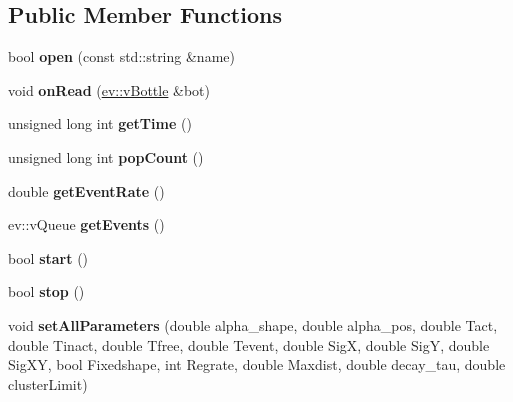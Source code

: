 \subsection*{Public Member Functions}
\begin{DoxyCompactItemize}
\item 
bool {\bfseries open} (const std\+::string \&name)\hypertarget{classEventBottleManager_a41ce7bd0a716ab0a88c1ad505b02d20b}{}\label{classEventBottleManager_a41ce7bd0a716ab0a88c1ad505b02d20b}

\item 
void {\bfseries on\+Read} (\hyperlink{classev_1_1vBottle}{ev\+::v\+Bottle} \&bot)\hypertarget{classEventBottleManager_aa848144d06e1970fb3c0482da838f078}{}\label{classEventBottleManager_aa848144d06e1970fb3c0482da838f078}

\item 
unsigned long int {\bfseries get\+Time} ()\hypertarget{classEventBottleManager_af15b5cfdc457500423111c22dee264d2}{}\label{classEventBottleManager_af15b5cfdc457500423111c22dee264d2}

\item 
unsigned long int {\bfseries pop\+Count} ()\hypertarget{classEventBottleManager_a0b4fd036f14e713194d079467021ba3b}{}\label{classEventBottleManager_a0b4fd036f14e713194d079467021ba3b}

\item 
double {\bfseries get\+Event\+Rate} ()\hypertarget{classEventBottleManager_afff63d519aec2d607661a07d79052377}{}\label{classEventBottleManager_afff63d519aec2d607661a07d79052377}

\item 
ev\+::v\+Queue {\bfseries get\+Events} ()\hypertarget{classEventBottleManager_ae614e9d612bc1994741ff875decd9ee4}{}\label{classEventBottleManager_ae614e9d612bc1994741ff875decd9ee4}

\item 
bool {\bfseries start} ()\hypertarget{classEventBottleManager_ae0f9b17dcf7bbad0c6c79d93b6c7df5e}{}\label{classEventBottleManager_ae0f9b17dcf7bbad0c6c79d93b6c7df5e}

\item 
bool {\bfseries stop} ()\hypertarget{classEventBottleManager_a84ffd3b05e997ab4e92f448459f0da7c}{}\label{classEventBottleManager_a84ffd3b05e997ab4e92f448459f0da7c}

\item 
void {\bfseries set\+All\+Parameters} (double alpha\+\_\+shape, double alpha\+\_\+pos, double Tact, double Tinact, double Tfree, double Tevent, double SigX, double SigY, double Sig\+XY, bool Fixedshape, int Regrate, double Maxdist, double decay\+\_\+tau, double cluster\+Limit)\hypertarget{classEventBottleManager_a451485cebdadbbad730d176894d9f0b1}{}\label{classEventBottleManager_a451485cebdadbbad730d176894d9f0b1}


\end{DoxyCompactItemize}
